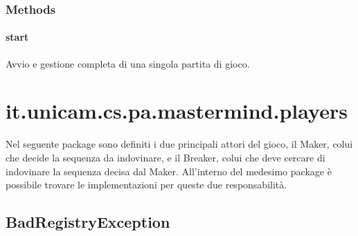 \documentclass[letterpaper,10pt,italian,openany,oneside]{sphinxmanual}
\begin{document}
\subsubsection{Methods}
\label{\detokenize{source/it/unicam/cs/pa/mastermind/gamecore/SingleMatch:methods}}

\paragraph{start}
\label{\detokenize{source/it/unicam/cs/pa/mastermind/gamecore/SingleMatch:start}}

\begin{fulllineitems}
\label{\detokenize{source/it/unicam/cs/pa/mastermind/gamecore/SingleMatch:it.unicam.cs.pa.mastermind.gamecore.SingleMatch.start()}}
Avvio e gestione completa di una singola partita di gioco.

\end{fulllineitems}



\section{it.unicam.cs.pa.mastermind.players}
\label{\detokenize{source/it/unicam/cs/pa/mastermind/players/package-index:it-unicam-cs-pa-mastermind-players}}\label{\detokenize{source/it/unicam/cs/pa/mastermind/players/package-index::doc}}
Nel seguente package sono definiti i due principali attori del gioco, il Maker, colui che decide la sequenza da indovinare, e il Breaker, colui che deve cercare di indovinare la sequenza decisa dal Maker. All’interno del medesimo package è possibile trovare le implementazioni per queste due responsabilità.

\label{\detokenize{source/it/unicam/cs/pa/mastermind/players/package-index:package-it.unicam.cs.pa.mastermind.players}}

\subsection{BadRegistryException}
\label{\detokenize{source/it/unicam/cs/pa/mastermind/players/BadRegistryException:badregistryexception}}\label{\detokenize{source/it/unicam/cs/pa/mastermind/players/BadRegistryException::doc}}
\end{document}

